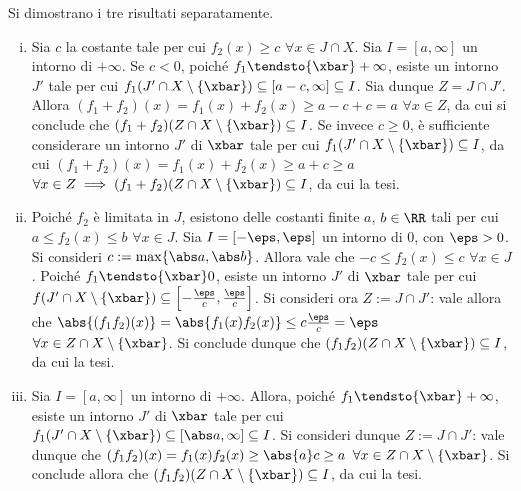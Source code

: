 \documentclass[11pt]{article}
\begin{document}
	\begin{solution} Si dimostrano i tre risultati separatamente.
		
		\begin{enumerate}[(i)]
			\item Sia $c$ la costante tale per cui $f_2(x) \geq c$ $\forall x \in J \cap X$. Sia $I = [a, \infty]$ un intorno di $+\infty$. Se $c < 0$, poiché $f_1 \tendsto{\xbar} +\infty$, esiste un intorno $J'$ tale per cui $f_1(J' \cap X \setminus \{ \xbar \}) \subseteq [a-c, \infty] \subseteq I$. Sia dunque $Z = J \cap J'$. Allora
			$(f_1 + f_2)(x) = f_1(x) + f_2(x) \geq a-c+c = a$ $\forall x \in Z$, da cui si conclude che
			$(f_1 + f_2)(Z \cap X \setminus \{\xbar\}) \subseteq I$. Se invece $c \geq 0$, è sufficiente considerare
			un intorno $J'$ di $\xbar$ tale per cui $f_1(J' \cap X \setminus \{\xbar\}) \subseteq I$, da cui
			$(f_1 + f_2)(x) = f_1(x) + f_2(x) \geq a+c \geq a$ $\forall x \in Z \implies (f_1+f_2)(Z \cap X \setminus \{\xbar\}) \subseteq I$, da cui la tesi.
			
			\item Poiché $f_2$ è limitata in $J$, esistono delle costanti finite $a$, $b \in \RR$ tali per cui $a \leq f_2(x) \leq b$ $\forall x \in J$. Sia
			$I = [-\eps, \eps]$ un intorno di $0$, con $\eps > 0$. Si consideri $c := \max\{\abs a, \abs b\}$.
			Allora vale che $-c \leq f_2(x) \leq c$ $\forall x \in J$. Poiché $f_1 \tendsto{\xbar} 0$, esiste
			un intorno $J'$ di $\xbar$ tale per cui $f(J' \cap X \setminus \{\xbar\}) \subseteq \left[-\frac{\eps}{c}, \frac{\eps}{c}\right]$. Si consideri ora $Z := J \cap J'$: vale allora che $\abs{(f_1 f_2)(x)} = \abs{f_1(x) f_2(x)} \leq c \frac{\eps}{c} = \eps$ $\forall x \in Z \cap X \setminus \{\xbar\}$. Si conclude
			dunque che $(f_1f_2)(Z \cap X \setminus \{\xbar\}) \subseteq I$, da cui la tesi.
			
			\item Sia $I = [a, \infty]$ un intorno di $+\infty$. Allora, poiché $f_1 \tendsto{\xbar} +\infty$,
			esiste un intorno $J'$ di $\xbar$ tale per cui $f_1(J' \cap X \setminus \{\xbar\}) \subseteq [\abs a, \infty] \subseteq I$. Si
			consideri dunque $Z := J \cap J'$: vale dunque che $(f_1f_2)(x) = f_1(x) f_2(x) \geq \abs{a}c \geq a$ $\forall x \in Z \cap X \setminus \{\xbar\}$. Si conclude allora che $(f_1f_2)(Z \cap X \setminus \{\xbar\}) \subseteq I$, da cui la tesi.
		\end{enumerate}
		
	\end{solution}
\end{document}
